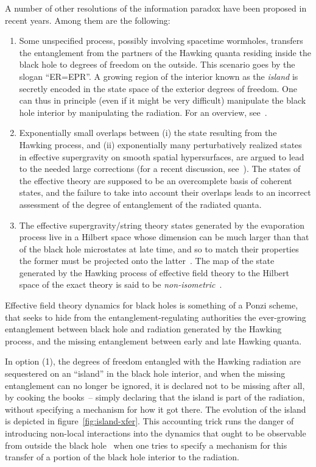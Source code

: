 \documentclass[11pt]{article}
\newcommand{\rcite}{\cite}
\numberwithin{equation}{section}
\begin{document}
A number of other resolutions of the information paradox have been proposed in recent years.  Among them are the following:
\begin{enumerate}[(1)]
%
\item
Some unspecified process, possibly involving spacetime wormholes, transfers the entanglement from the partners of the Hawking quanta residing inside the black hole to degrees of freedom on the outside.  This scenario goes by the slogan ``ER=EPR''.  A growing region of the interior known as the {\it island} is secretly encoded in the state space of the exterior degrees of freedom.  One can thus in principle (even if it might be very difficult) manipulate the black hole interior by manipulating the radiation.  For an overview, see~\rcite{Almheiri:2020cfm}.
%
\item  
Exponentially small overlaps between (i) the state resulting from the Hawking process, and (ii) exponentially many perturbatively realized states in effective supergravity on smooth spatial hypersurfaces, are argued to lead to the needed large corrections (for a recent discussion, see~\rcite{Chakravarty:2020wdm,Balasubramanian:2022gmo,Balasubramanian:2022lnw}).  
The states of the effective theory are supposed to be an overcomplete basis of coherent states, and the failure to take into account their overlaps leads to an incorrect assessment of the degree of entanglement of the radiated quanta.
%
\item
The effective supergravity/string theory states generated by the evaporation process live in a Hilbert space whose dimension can be much larger than that of the black hole microstates at late time, and so to match their properties the former must be projected onto the latter~\rcite{Akers:2022qdl}.  The map of the state generated by the Hawking process of effective field theory to the Hilbert space of the exact theory is said to be {\it non-isometric}~\rcite{Verlinde:2012cy,Marolf:2013dba}.
\end{enumerate}



Effective field theory dynamics for black holes is something of a Ponzi scheme, that seeks to hide from the entanglement-regulating authorities the ever-growing entanglement between black hole and radiation generated by the Hawking process, and the missing entanglement between early and late Hawking quanta.  

In option (1), the degrees of freedom entangled with the Hawking radiation are sequestered on an ``island'' in the black hole interior, and when the missing entanglement can no longer be ignored, it is declared not to be missing after all, by cooking the books~-- simply declaring that the island is part of the radiation, without specifying a mechanism for how it got there.
The evolution of the island is depicted in figure~\ref{fig:island-xfer}.
This accounting trick runs the danger of introducing non-local interactions into the dynamics that ought to be observable from outside the black hole~\rcite{Martinec:2022lsb} when one tries to specify a mechanism for this transfer of a portion of the black hole interior to the radiation.
\end{document}
